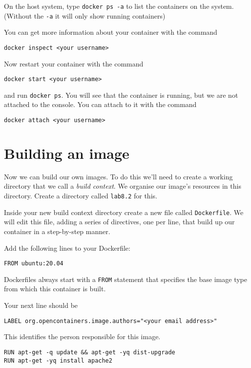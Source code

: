 \documentclass{article}
\begin{document}
On the host system, type \texttt{docker ps -a} to list the containers on the system. (Without the \texttt{-a} it will only
show running containers) 

You can get more information about your container with the command

\begin{verbatim}
docker inspect <your username>
\end{verbatim}

Now restart your container with the command

\begin{verbatim}
docker start <your username>
\end{verbatim}

and run \texttt{docker ps}. You will see that the container is running, but we are not attached to the console. You can attach to it with the command

\begin{verbatim}
docker attach <your username>
\end{verbatim}



\section{Building an image}
Now we can build our own images. To do this we'll need to create a working directory that we call a \emph{build context}. We organise our image's resources in this directory. Create a directory called \texttt{lab8.2} for this.

Inside your new build context directory create a new file called \texttt{Dockerfile}. We will edit this file, adding a series of directives, one per line, that build up our container in a step-by-step manner.

Add the following lines to your Dockerfile:

\texttt{FROM ubuntu:20.04}

Dockerfiles always start with a \texttt{FROM} statement that specifies the base image type from which this container is built.

Your next line should be

\texttt{LABEL org.opencontainers.image.authors="<your email address>"}

This identifies the person responsible for this image.

\begin{verbatim}
RUN apt-get -q update && apt-get -yq dist-upgrade
RUN apt-get -yq install apache2
\end{verbatim}
\end{document}
